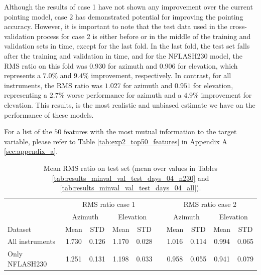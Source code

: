 Although the results of case 1 have not shown any improvement over the current pointing model, case 2 has demonstrated potential for improving the pointing accuracy.
However, it is important to note that the test data used in the cross-validation process for case 2 is either before or in the middle of the training and validation sets in time, except for the last fold.
In the last fold, the test set falls after the training and validation in time, and for the NFLASH230 model,
the RMS ratio on this fold was $0.930$ for azimuth and $0.906$ for elevation, which represents a $7.0\%$ and $9.4\%$ improvement, respectively.
In contrast, for all instruments, the RMS ratio was $1.027$ for azimuth and $0.951$ for elevation, representing a $2.7\%$ worse performance for azimuth and a $4.9\%$ improvement for elevation.
This results, is the most realistic and unbiased estimate we have on the performance of these models.

For a list of the $50$ features with the most mutual information to the target variable, please refer to Table \ref{tab:exp2_top50_features} in Appendix A \ref{sec:appendix_a}.

\begin{table}[!htbp]
    \centering
    \caption{Mean RMS ratio on test set (mean over values in Tables \ref{tab:results_minval_val_test_days_04_n230} and \ref{tab:results_minval_val_test_days_04_all}).}
    \begin{tabular}{lcccc c cccc}
        \toprule
        \multicolumn{1}{c}{} & \multicolumn{4}{c}{RMS ratio case 1} & & \multicolumn{4}{c}{RMS ratio case 2} \\
        \cmidrule(lr){2-5} \cmidrule(lr){7-10}
        \multicolumn{1}{c}{} & \multicolumn{2}{c}{Azimuth} & \multicolumn{2}{c}{Elevation} & & \multicolumn{2}{c}{Azimuth} & \multicolumn{2}{c}{Elevation} \\ 
        \cmidrule(lr){2-5} \cmidrule(lr){7-10}
        Dataset &  Mean &  STD &  Mean &  STD & & Mean &  STD &  Mean &  STD \\
        \midrule
        All instruments   &     1.730 &     0.126 &     1.170 &     0.028 &  &   1.016 &     0.114 &     0.994 &     0.065 \\
        Only NFLASH230    &     1.251 &     0.131 &     1.198 &     0.033 &  &   0.958 &     0.055 &     0.941 &     0.079 \\
        \bottomrule
    \end{tabular}
    \label{tab:results_minval_days04}
\end{table}


